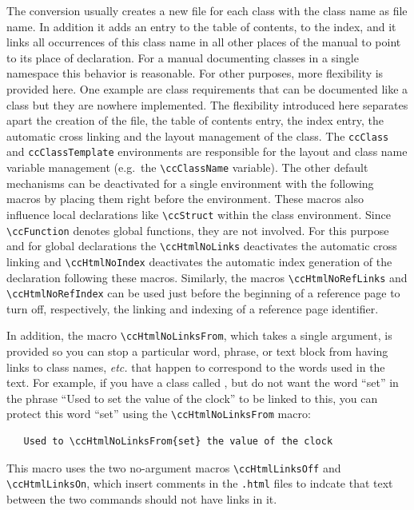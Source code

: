 \documentclass[11pt]{article}
\begin{document}
The conversion usually creates a new file for each class with the
class name as file name. In addition it adds an entry to the table of
contents, to the index, and it links all occurrences of this class name
in all other places of the manual to point to its place of
declaration. For a manual documenting classes in a single namespace
this behavior is reasonable. For other purposes, more flexibility is
provided here. One example are class requirements that can be
documented like a class but they are nowhere implemented. The
flexibility introduced here separates apart the creation of the file,
the table of contents entry, the index entry, the automatic cross
linking and the layout management of the class. The \verb+ccClass+ and
\verb+ccClassTemplate+ environments are responsible for the layout and
class name variable management (e.g.~the \verb+\ccClassName+ variable).
The other default mechanisms can be deactivated for a single
environment with the following macros by placing them right before the
environment. These macros also influence local declarations like
\verb+\ccStruct+ within the class environment.  Since
\verb+\ccFunction+ denotes global functions, they are not involved.
For this purpose and for global declarations the \verb+\ccHtmlNoLinks+
deactivates the automatic cross linking and \verb+\ccHtmlNoIndex+
deactivates the automatic index generation of the declaration
following these macros.  Similarly, the macros \verb+\ccHtmlNoRefLinks+
and \verb+\ccHtmlNoRefIndex+ can be used just before the beginning of
a reference page to turn off, respectively, the linking and indexing 
of a reference page identifier.

In addition, the macro \verb+\ccHtmlNoLinksFrom+, which takes a single
argument, is provided so you can stop a particular word, phrase, or
text block from having links to class names, {\em etc.} that happen
to correspond to the words used in the text.  For example, if you have
a class called , but do not want the word ``set'' in the
phrase ``Used to set the value of the clock''  to be linked to this,
you can protect this word ``set'' using the \verb+\ccHtmlNoLinksFrom+ macro:

\begin{verbatim}
   Used to \ccHtmlNoLinksFrom{set} the value of the clock
\end{verbatim}

This macro uses the two no-argument macros \verb+\ccHtmlLinksOff+ and
\verb+\ccHtmlLinksOn+, which insert comments in the {\tt .html} files 
to indcate that text between the two commands should not have links
in it.
\end{document}
